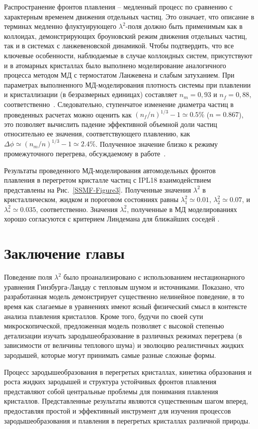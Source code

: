 Распространение фронтов плавления -- медленный процесс по сравнению с характерным временем движения отдельных частиц.
Это означает, что описание в терминах медленно флуктуирующего $\lambda^2$-поля должно быть применимым как в коллоидах, демонстрирующих броуновский режим движения отдельных частиц, так и в системах с ланжевеновской динамикой.
Чтобы подтвердить, что все ключевые особенности, наблюдаемые в случае коллоидных систем, присутствуют и в атомарных кристаллах было выполнено моделирование аналогичного процесса методом МД с термостатом Ланжевена и слабым затуханием.
При параметрах выполненного МД-моделирования плотность системы при плавлении и кристаллизации (в безразмерных единицах) составляет $ n_m = 0,93 $ и $ n_f = 0,88 $, соответственно~\cite{10.1080/00268979500100911}.
Следовательно, ступенчатое изменение диаметра частиц в проведенных расчетах можно оценить как $ (n_f / n) ^ {1/3} -1 \simeq 0.5 \% $ ($ n = 0.867 $), это позволяет вычислить падение эффективной объемной доли частиц относительно ее значения, соответствующего плавлению, как
$\Delta \phi  \simeq (n_m/n)^{1/3}-1\simeq 2.4\%$.
Полученное значение близко к режиму промежуточного перегрева, обсуждаемому в работе~\cite{10.1038/ncomms7942}.


Результаты проведенного МД-моделирования автомодельных фронтов \\ плавления в перегретом кристалле частиц с IPL18 взаимодействием представлены на Рис.~\ref{SSMF-Figure3}.
Полученные значения $\lambda^2$ в кристаллическом, жидком и пороговом состояниях равны $\lambda_1^2 \simeq 0.01$, $\lambda_2^2 \simeq 0.07$, и $\lambda_\ast^2 \simeq 0.035$, соответственно.
Значения $\lambda_\ast^2$, полученные в МД моделированиях хорошо согласуются с критерием Линдемана для ближайших соседей \cite{10.1016/0375-9601(85)90617-6}.


\section{Заключение главы}

Поведение поля $\lambda^2$ было проанализировано с использованием нестационарного уравнения Гинзбурга-Ландау с тепловым шумом и источниками.
Показано, что разработанная модель демонстрирует существенно нелинейное поведение, в то время как слагаемые в уравнениях имеют ясный физический смысл в контексте анализа плавления кристаллов.
Кроме того, будучи по своей сути микроскопической, предложенная модель позволяет с высокой степенью детализации изучать зародышеобразование в различных режимах перегрева (в зависимости от величины теплового шума) и эволюцию реалистичных жидких зародышей, которые могут принимать самые разные сложные формы.


Процесс зародышеобразования в перегретых кристаллах, кинетика образования и роста жидких зародышей и структура устойчивых фронтов плавления представляют собой центральные проблемы для понимания плавления кристаллов.
Представленные результаты являются существенным шагом вперед, предоставляя простой и эффективный инструмент для изучения процессов зародышеобразования и плавления в перегретых кристаллах различной природы.

